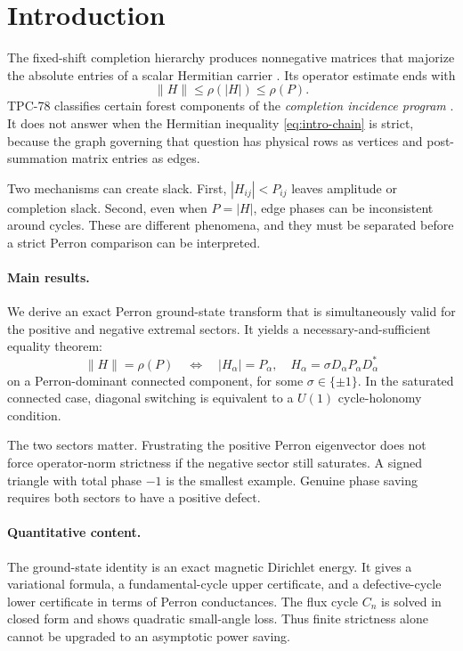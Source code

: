 \section{Introduction}

The fixed-shift completion hierarchy produces nonnegative matrices that
majorize the absolute entries of a scalar Hermitian carrier
\cite{WangTPC75}.  Its operator estimate ends with
\begin{equation}\label{eq:intro-chain}
 \|H\|\le\rho(|H|)\le\rho(P).
\end{equation}
TPC-78 classifies certain forest components of the \emph{completion
incidence program} \cite{WangTPC78}.  It does not answer when the
Hermitian inequality \eqref{eq:intro-chain} is strict, because the graph
governing that question has physical rows as vertices and post-summation
matrix entries as edges.

Two mechanisms can create slack.  First,
\(|H_{ij}|<P_{ij}\) leaves amplitude or completion slack.  Second,
even when \(P=|H|\), edge phases can be inconsistent around cycles.
These are different phenomena, and they must be separated before a
strict Perron comparison can be interpreted.

\paragraph{Main results.}
We derive an exact Perron ground-state transform that is simultaneously
valid for the positive and negative extremal sectors.  It yields a
necessary-and-sufficient equality theorem:
\[
 \|H\|=\rho(P)
 \quad\Longleftrightarrow\quad
 |H_\alpha|=P_\alpha,\quad
 H_\alpha=\sigma D_\alpha P_\alpha D_\alpha^*
\]
on a Perron-dominant connected component, for some
\(\sigma\in\{\pm1\}\).  In the saturated connected case, diagonal
switching is equivalent to a \(U(1)\) cycle-holonomy condition.

The two sectors matter.  Frustrating the positive Perron eigenvector
does not force operator-norm strictness if the negative sector still
saturates.  A signed triangle with total phase \(-1\) is the smallest
example.  Genuine phase saving requires both sectors to have a
positive defect.

\paragraph{Quantitative content.}
The ground-state identity is an exact magnetic Dirichlet energy.
It gives a variational formula, a fundamental-cycle upper certificate,
and a defective-cycle lower certificate in terms of Perron
conductances.  The flux cycle \(C_n\) is solved in closed form and
shows quadratic small-angle loss.  Thus finite strictness alone cannot
be upgraded to an asymptotic power saving.

